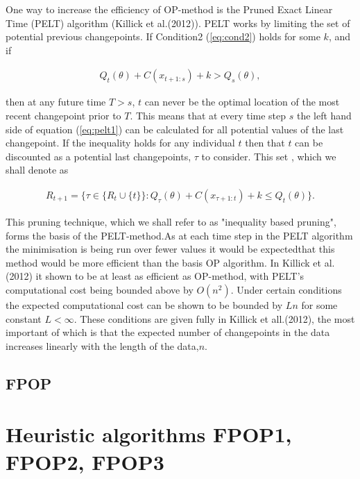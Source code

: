 \documentclass[a4paper,12pt]{article}
\begin{document}
		One way to increase the efficiency of OP-method is the Pruned Exact Linear Time (PELT) algorithm (Killick et al.(2012)). PELT works by limiting the set of potential previous changepoints.
		If Condition2 (\ref{eq:cond2}) holds for some $k$, and if 
		
		 \begin{equation}
			\begin{gathered}
				Q_t (\theta) + C(x_{t+1:s}) +k > Q_s(\theta),
			\end{gathered}
			\label{eq:pelt1}
		\end{equation}
		
		then at any future time $T>s$, $t$ can never be the optimal location of the most recent changepoint prior to $T$. This means that at every time step $s$ the left hand side of equation (\ref{eq:pelt1}) can be calculated for all potential values of the last changepoint. If the inequality holds for any individual $t$ then that $t$ can be discounted as a potential last changepoints, $\tau$ to consider. This set , which we shall denote as 
		
		\begin{equation}
			\begin{gathered}
					R_{t+1} = \{ \tau \in \{ R_t\cup \{t\}\}: Q_\tau(\theta)+C(x_{\tau+1:t}) +k \le Q_t (\theta)\}.
			\end{gathered}
			\label{eq:pelt2}
		\end{equation}
		
		This pruning technique, which we shall refer to as "inequality based pruning", forms the basis of the PELT-method.As at each time step in the PELT algorithm the minimisation is being run over fewer values it would be expectedthat this method would be more efficient than the basis OP algorithm. In Killick et al.(2012) it shown to be at least as efficient as OP-method, with PELT's computational cost being bounded above by  $O(n^2)$. Under certain conditions the expected computational cost can be shown to be bounded by $Ln$ for some constant $L< \infty$. These conditions are given fully in Killick et all.(2012), the most important of which is that the expected number of changepoints in the data increases linearly with the length of the data,$n$.
		
		\subsection{FPOP}
		\label{FPOP}	
	\section{Heuristic algorithms FPOP1, FPOP2, FPOP3}
	\label{section3}
\end{document}
